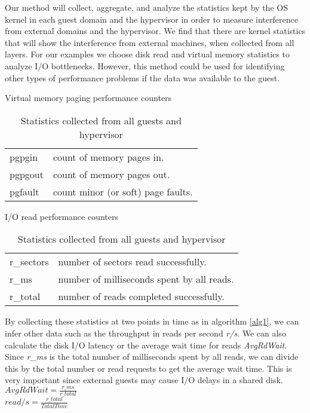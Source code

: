 Our method will collect, aggregate, and analyze the statistics kept by the OS kernel in each guest domain and the hypervisor in order to measure interference from external domains and the hypervisor.  We find that there are kernel statistics that will show the interference from external machines, when collected from all layers.  For our examples we choose disk read and virtual memory statistics to analyze I/O bottlenecks.  However, this method could be used for identifying other types of performance problems if the data was available to the guest.

\begin{table}[h]
\begin{subtable}[h]{0.45\textwidth}
\caption{Virtual memory paging performance counters \cite{memory}}
\begin{tabular}{ l l }
       pgpgin  &  count of memory pages in. \\
       pgpgout  & count of memory pages out. \\
       pgfault  & count minor (or soft) page faults. \\
\end{tabular}
\label{fig:memory}
\end{subtable}
\hfill
\begin{subtable}[h]{0.45\textwidth}
\caption{I/O read performance counters \cite{iostats}}
\begin{tabular}{ l l }
       r\_sectors & number of sectors read successfully. \\
       r\_ms & number of milliseconds spent by all reads. \\
       r\_total & number of reads completed successfully. \\
\end{tabular}
\label{fig:io}
\end{subtable}
\caption{Statistics collected from all guests and hypervisor}
\end{table}

By collecting these statistics at two points in time as in algorithm \ref{alg1}, we can infer other data such as the throughput in reads per second \emph{r/s}.  We can also calculate the disk I/O latency or the average wait time for reads \emph{AvgRdWait}.  
Since \emph{r\_ms} is the total number of milliseconds spent by all reads, we can divide this by the total number or read requests to get the average wait time.  This is very important since external guests may cause I/O delays in a shared disk.
\newline\newline
\Large
	$AvgRdWait = \frac{r\_ms}{r\_total}$ \\
	$read/s = \frac{r\_total}{TotalTime}$ \\
\normalsize

